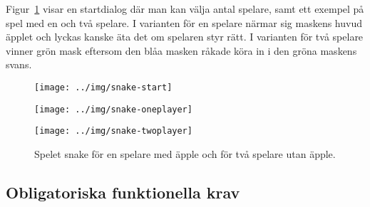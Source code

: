 Figur~\ref{fig:snake-game} visar en startdialog där man kan välja antal spelare, samt ett exempel på spel med en och två spelare. I varianten för en spelare närmar sig maskens huvud äpplet och lyckas kanske äta det om spelaren styr rätt.  I varianten för två spelare vinner grön mask eftersom den blåa masken råkade köra in i den gröna maskens svans.
\begin{figure}[H]
\begin{minipage}{0.45\textwidth}
\texttt{[image: ../img/snake-start]}

\texttt{[image: ../img/snake-oneplayer]}
\end{minipage}
\begin{minipage}{0.5\textwidth}
\texttt{[image: ../img/snake-twoplayer]}
\end{minipage}
\caption{Spelet snake för en spelare med äpple och för två spelare utan äpple. \label{fig:snake-game}}
\end{figure}

\subsection{Obligatoriska funktionella krav}

